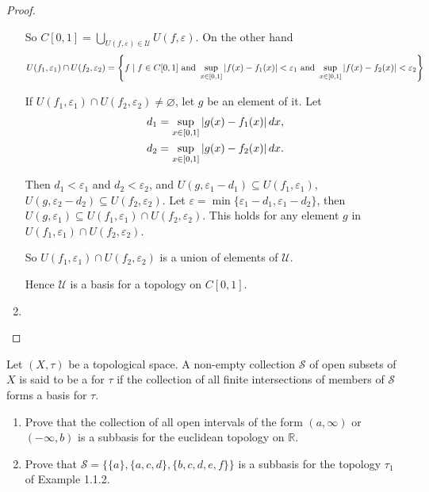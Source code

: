 \begin{proof}
\begin{enumerate}[label={(\roman*)}]
		      So $C[0, 1] = \bigcup_{U(f, \varepsilon)\in \mathcal{U}} U(f, \varepsilon)$. On the other hand
		      \[
			      U(f_{1}, \varepsilon_{1})\cap U(f_{2}, \varepsilon_{2}) = \left\{ f \mid f\in C[0, 1] \text{ and } \sup_{x\in [0, 1]} \left\vert{f(x) - f_{1}(x)}\right\vert < \varepsilon_{1} \text{ and } \sup_{x\in [0, 1]} \left\vert{f(x) - f_{2}(x)}\right\vert < \varepsilon_{2} \right\}
		      \]

		      If $U(f_{1}, \varepsilon_{1})\cap U(f_{2}, \varepsilon_{2})\ne \varnothing$, let $g$ be an element of it. Let
		      \[
			      \begin{split}
				      d_{1} = \sup_{x\in [0, 1]}\left\vert{g(x) - f_{1}(x)}\right\vert dx, \\
				      d_{2} = \sup_{x\in [0, 1]}\left\vert{g(x) - f_{2}(x)}\right\vert dx.
			      \end{split}
		      \]

		      Then $d_{1} < \varepsilon_{1}$ and $d_{2} < \varepsilon_{2}$, and $U(g, \varepsilon_{1} - d_{1})\subseteq U(f_{1}, \varepsilon_{1})$, $U(g, \varepsilon_{2} - d_{2})\subseteq U(f_{2}, \varepsilon_{2})$. Let $\varepsilon = \min\{ \varepsilon_{1} - d_{1}, \varepsilon_{1} - d_{2} \}$, then $U(g, \varepsilon_{1})\subseteq U(f_{1}, \varepsilon_{1})\cap U(f_{2}, \varepsilon_{2})$. This holds for any element $g$ in $U(f_{1}, \varepsilon_{1})\cap U(f_{2}, \varepsilon_{2})$.

		      So $U(f_{1}, \varepsilon_{1})\cap U(f_{2}, \varepsilon_{2})$ is a union of elements of $\mathcal{U}$.

		      Hence $\mathcal{U}$ is a basis for a topology on $C[0, 1]$.
		\item %
	\end{enumerate}
\end{proof}
\newpage

\begin{exercise}
	Let $(X, \tau)$ be a topological space. A non-empty collection $\mathcal{S}$ of open subsets of $X$ is said to be a {\color{red}{subbasis}} for $\tau$ if the collection of all finite intersections of members of $\mathcal{S}$ forms a basis for $\tau$.
	\begin{enumerate}[label={(\roman*)}]
		\item Prove that the collection of all open intervals of the form $(a, \infty)$ or $(-\infty, b)$ is a subbasis for the euclidean topology on $\mathbb{R}$.
		\item Prove that $\mathcal{S} = \{ \{ a \}, \{ a, c, d \}, \{ b, c, d, e, f \} \}$ is a subbasis for the topology $\tau_{1}$ of Example 1.1.2.
	\end{enumerate}
\end{exercise}

